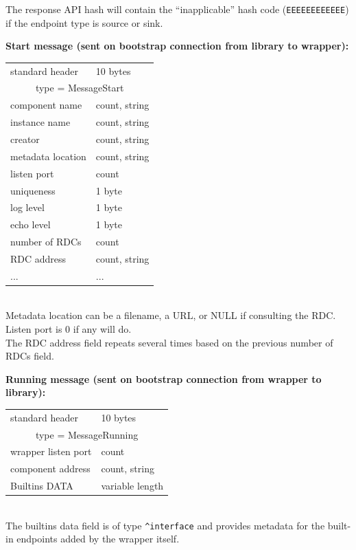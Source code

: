 \documentclass[12pt,a4paper,twoside]{article}
\renewcommand{\_}{\texttt{\symbol{95}}}
\begin{document}
The response API hash will contain the ``inapplicable'' hash code
(\verb^EEEEEEEEEEEE^) if the endpoint type is source or sink.

\textbf{Start message (sent on bootstrap connection from library to wrapper):}

\begin{tabular}{|ll|}
\hline
standard header    & 10 bytes\\
\multicolumn{2}{|c|}{type = MessageStart}\\
\hline
component name     & count, string\\
instance name      & count, string\\
creator            & count, string\\
metadata location  & count, string\\
listen port        & count\\
uniqueness         & 1 byte\\
log level          & 1 byte\\
echo level         & 1 byte\\
number of RDCs     & count\\
\hline
RDC address        & count, string\\
...                & ...\\
\hline
\end{tabular}\\

Metadata location can be a filename, a URL, or NULL if consulting the RDC.\\
Listen port is 0 if any will do.\\
The RDC address field repeats several times based on the previous
number of RDCs field.

\textbf{Running message (sent on bootstrap connection from wrapper to library):}

\begin{tabular}{|ll|}
\hline
standard header    & 10 bytes\\
\multicolumn{2}{|c|}{type = MessageRunning}\\
\hline
wrapper listen port & count\\
component address   & count, string\\
Builtins DATA       & variable length\\
\hline
\end{tabular}\\

The builtins data field is of type \verb~^interface~ and provides
metadata for the built-in endpoints added by the wrapper itself.
\end{document}
